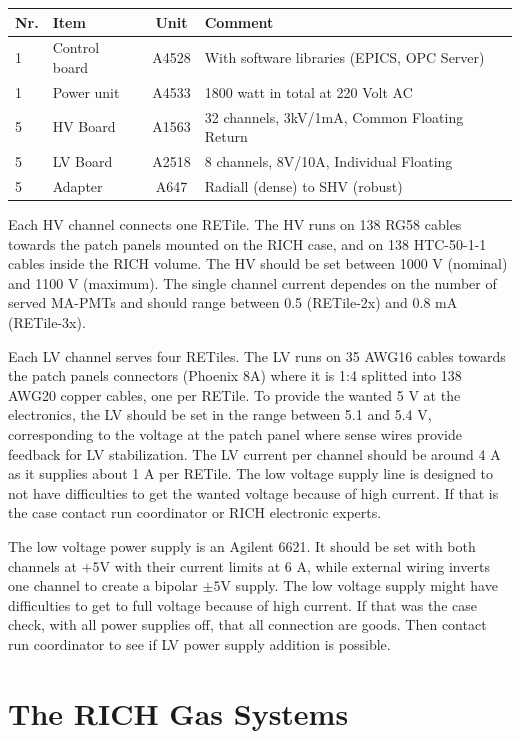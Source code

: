 \documentclass[12pt]{article}
\begin{document}
\vspace*{0.5cm}
\begin{tabular}{llcl} \hline
Nr. & Item & Unit &  Comment \\ \hline
1 & Control board &  A4528    &  With software libraries (EPICS, OPC Server) \\
1 & Power unit    &  A4533    & 1800 watt in total at 220 Volt AC \\
5 & HV Board      &  A1563    & 32 channels, 3kV/1mA, Common Floating Return \\
5 & LV Board      &  A2518    & 8 channels, 8V/10A, Individual Floating \\
5 & Adapter       &  A647     & Radiall (dense) to SHV (robust)  \\\hline
\end{tabular}


\vspace*{0.5cm}
Each HV channel connects one RETile. The HV runs on 138 RG58 cables towards the patch panels mounted 
on the RICH case, and on 138 HTC-50-1-1 cables inside the RICH volume. The HV should be set between 
1000 V (nominal) and 1100 V (maximum). The single channel current dependes on the number of served 
MA-PMTs and should range between 0.5 (RETile-2x) and 0.8 mA (RETile-3x). 

Each LV channel serves four RETiles. The LV runs on 35 AWG16 cables towards the patch panels
connectors (Phoenix 8A) where it is 1:4 splitted into 138 AWG20 copper cables, one per RETile. To 
provide the wanted 5 V at the electronics, the LV should be set in the range between 5.1 and 5.4 V, 
corresponding to the voltage at the patch panel where sense wires provide feedback for
LV stabilization. The LV current per channel should be around 4 A as it supplies about 1 A per 
RETile. The low voltage supply line is designed to not have difficulties to get 
the wanted voltage because of high current. If that is the case contact run coordinator or RICH 
electronic experts.

The low voltage power supply is an Agilent 6621.  It should be set with both channels at $+5$V with their current limits at 6 A, while external wiring inverts one channel to create a bipolar $\pm5$V supply. 
The low voltage supply might have difficulties to get to full voltage because of high current. If that was the case check, with all power supplies off, that all connection are goods. Then contact run coordinator to see if LV power supply addition is possible. 

{\color{blue}
\section{The RICH Gas Systems}
}
\end{document}

